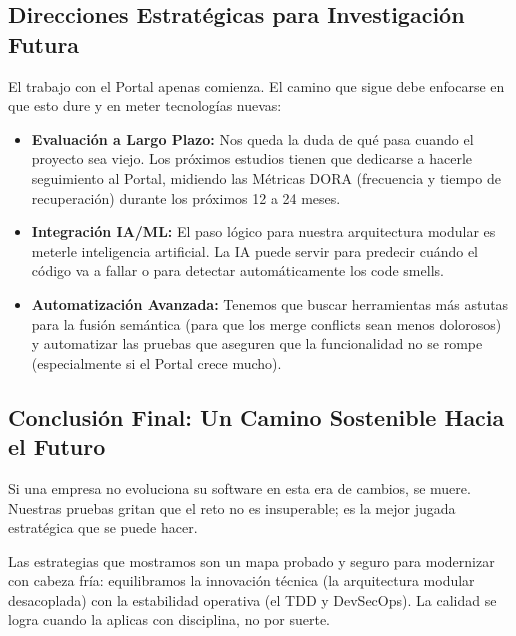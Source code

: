 \subsection{Direcciones Estratégicas para Investigación Futura}

El trabajo con el Portal apenas comienza. El camino que sigue debe enfocarse en que esto dure y en meter tecnologías nuevas:

\begin{itemize}
\item \textbf{Evaluación a Largo Plazo:} Nos queda la duda de qué pasa cuando el proyecto sea viejo. Los próximos estudios tienen que dedicarse a hacerle seguimiento al Portal, midiendo las Métricas DORA (frecuencia y tiempo de recuperación) durante los próximos 12 a 24 meses.

\item \textbf{Integración IA/ML:} El paso lógico para nuestra arquitectura modular es meterle inteligencia artificial. La IA puede servir para predecir cuándo el código va a fallar o para detectar automáticamente los code smells.

\item \textbf{Automatización Avanzada:} Tenemos que buscar herramientas más astutas para la fusión semántica (para que los merge conflicts sean menos dolorosos) y automatizar las pruebas que aseguren que la funcionalidad no se rompe (especialmente si el Portal crece mucho).
\end{itemize}

\subsection{Conclusión Final: Un Camino Sostenible Hacia el Futuro}

Si una empresa no evoluciona su software en esta era de cambios, se muere. Nuestras pruebas gritan que el reto no es insuperable; es la mejor jugada estratégica que se puede hacer.

Las estrategias que mostramos son un mapa probado y seguro para modernizar con cabeza fría: equilibramos la innovación técnica (la arquitectura modular desacoplada) con la estabilidad operativa (el TDD y DevSecOps). La calidad se logra cuando la aplicas con disciplina, no por suerte.